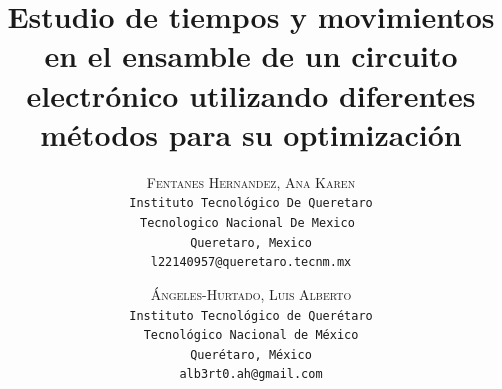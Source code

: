 \lfoot{ \thepage}

\setlength{\droptitle}{-5\baselineskip} %
\title{\textbf{Estudio de tiempos y movimientos en el ensamble de un circuito electrónico utilizando diferentes métodos para su optimización }} %

 \author{ 
 \textsc{Fentanes Hernandez, Ana Karen}\\ 
 \texttt{Instituto Tecnológico De Queretaro} \\ 
 \texttt{Tecnologico Nacional De Mexico } \\ 
 \texttt{Queretaro, Mexico}\\ 
 \texttt{l22140957@queretaro.tecnm.mx} 
 \and 
 \textsc{Ángeles-Hurtado, Luis Alberto}\\ 
 \texttt{ Instituto Tecnológico de Querétaro } \\ 
 \texttt{ Tecnológico Nacional de México } \\ 
 \texttt{Querétaro, México}\\ 
 \texttt{alb3rt0.ah@gmail.com} 
}



% 

\maketitle
\thispagestyle{fancy}

